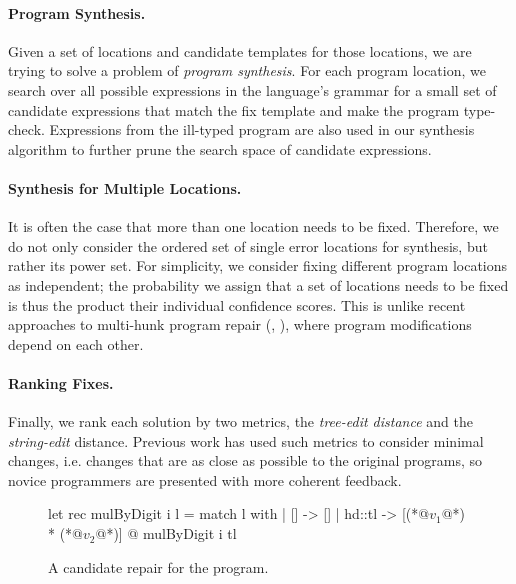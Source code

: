 \paragraph{Program Synthesis.} Given a set of locations and candidate templates for
those locations, we are trying to solve a problem of \emph{program synthesis}.
For each program location, we search over all possible
expressions in the language's grammar for a small set of candidate
expressions that match the fix template and make the program type-check.
Expressions from the ill-typed program are also used in our synthesis algorithm
to further prune the search space of candidate expressions.

\paragraph{Synthesis for Multiple Locations.}
It is often the case that more than one location needs to be fixed. Therefore,
we do not only consider the ordered set of single error locations for synthesis,
but rather its power set. For simplicity, we consider fixing different program
locations as independent; the probability we assign that a set of locations
needs to be fixed is thus the product their individual confidence scores. This
is unlike recent approaches to multi-hunk program repair (\eg,
\citep{Saha_2019}), where program modifications depend on each other.

\paragraph{Ranking Fixes.} Finally, we rank each solution by two metrics, the
\emph{tree-edit distance} and the \emph{string-edit} distance. Previous work
\citep{Lerner2007-dt, Wang_2018, Gulwani_2018} has used such metrics to consider
minimal changes, i.e. changes that are as close as possible to the original
programs, so novice programmers are presented with more coherent feedback.

\begin{figure}[ht]
  \begin{ecode}
  let rec mulByDigit i l =
    match l with
    | []     -> []
    | hd::tl -> [(*@$v_1$@*) * (*@$v_2$@*)] @ mulByDigit i tl
  \end{ecode}
  \caption{A candidate repair for the \mbd program.}
  \label{fig:repair}
  \end{figure}


